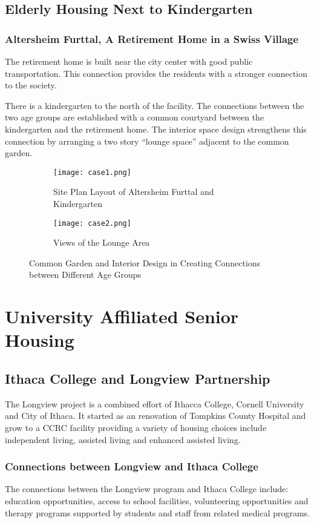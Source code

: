 \subsection{Elderly Housing Next to Kindergarten}
\subsubsection{Altersheim Furttal, A Retirement Home in a Swiss Village}
The retirement home is built near the city center with good public
transportation. This connection provides the residents with a stronger
connection to the society.

There is a kindergarten to the north of the facility. The connections
between the two age groups are established with a common courtyard
between the kindergarten and the retirement home. The interior space
design strengthens this connection by arranging a two story ``lounge
space'' adjacent to the common garden.

\begin{figure}
\centering
\begin{subfigure}{0.7\textwidth}
  \centering
  \texttt{[image: case1.png]}
  \caption{Site Plan Layout of Altersheim Furttal and Kindergarten}
  \label{fig:case1}
\end{subfigure}
\begin{subfigure}{0.7\textwidth}
  \centering
  \texttt{[image: case2.png]}
  \caption{Views of the Lounge Area}
  \label{fig:case2}
\end{subfigure}
\caption{Common Garden and Interior Design in Creating Connections
  between Different Age Groups}
\label{fig:case2}
\end{figure}
\section{University Affiliated Senior Housing}
\subsection{Ithaca College and Longview Partnership}
The Longview project is a combined effort of Ithacca College, Cornell
University and City of Ithaca. It started as an renovation of Tompkins
County Hospital and grow to a CCRC facility providing a variety of
housing choices include independent living, assisted living and
enhanced assisted living.

\subsubsection{Connections between Longview and Ithaca College}
The connections between the Longview program and Ithaca College
include: education opportunities, access to school facilities,
volunteering opportunities and therapy programs supported by students
and staff from related medical programs.


